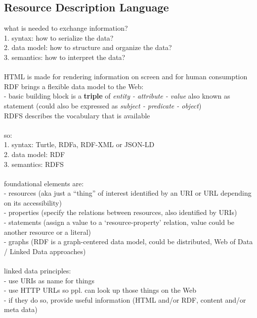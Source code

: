 
\subsection{Resource Description Language}
\label{sec:semantic_rdl}

what is needed to exchange information? \\
1. syntax: how to serialize the data? \\
2. data model: how to structure and organize the data? \\
3. semantics: how to interpret the data? \\
\\
HTML is made for rendering information on screen and for human consumption \\
RDF brings a flexible data model to the Web: \\
- basic building block is a \textbf{triple} of \textit{entity - attribute - value}
also known as statement (could also be expressed as \textit{subject - predicate - object}) \\
RDFS describes the vocabulary that is available \\
\\
so: \\
1. syntax: Turtle, RDFa, RDF-XML or JSON-LD \\
2. data model: RDF \\
3. semantics: RDFS \\
\\
foundational elements are: \\
- resources (aka just a ``thing'' of interest identified by an URI or URL depending on its accessibility) \\
- properties (specify the relations between resources, also identified by URIs) \\
- statements (assign a value to a `resource-property' relation, value could be another resource or a literal) \\
- graphs (RDF is a graph-centered data model, could be distributed, Web of Data / Linked Data approaches) \\
\\
linked data principles: \\
- use URIs as name for things \\
- use HTTP URLs so ppl. can look up those things on the Web \\
- if they do so, provide useful information (HTML and/or RDF, content and/or meta data) \\
